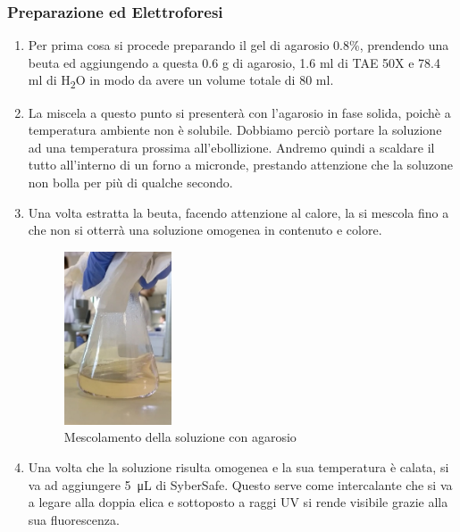 \subsubsection{Preparazione ed Elettroforesi}


\begin{enumerate}

	\item Per prima cosa si procede preparando il gel di agarosio 0.8\%, prendendo una beuta
	ed aggiungendo a questa 0.6 g di agarosio, 1.6 ml di TAE 50X e 78.4 ml di H\textsubscript{2}O
	in modo da avere un volume totale di 80 ml.

	\item La miscela a questo punto si presenterà con l'agarosio in fase solida,
	poichè a temperatura ambiente non è solubile.
	Dobbiamo perciò portare la soluzione ad una temperatura prossima all'ebollizione.
	Andremo quindi a scaldare il tutto all'interno di un forno a micronde, prestando attenzione
	che la soluzone non bolla per più di qualche secondo.

	\item Una volta estratta la beuta, facendo attenzione al calore,
	la si mescola fino a che non si otterrà una soluzione omogenea in contenuto e colore.

	\begin{figure}[H]
		\centering
		\includegraphics[width=0.3\textwidth]{./immagini/agarosio.jpg}
		\caption{Mescolamento della soluzione con agarosio}
		\label{agarosio}

	\end{figure}

	\item Una volta che la soluzione risulta omogenea e la sua temperatura \`e calata,
	si va ad aggiungere \SI{5}{\micro\liter} di SyberSafe.
	Questo serve come intercalante che si va a legare alla doppia elica
	e sottoposto a raggi UV si rende visibile grazie alla sua fluorescenza.


\end{enumerate}
